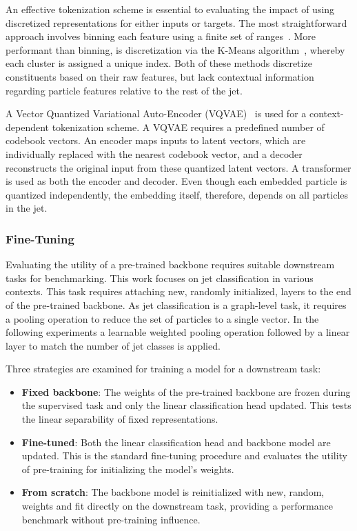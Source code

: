 An effective tokenization scheme is essential to evaluating the impact of using discretized representations for either inputs or targets.
The most straightforward approach involves binning each feature using a finite set of ranges~\cite{JetGPT}.
More performant than binning, is discretization via the K-Means algorithm~\cite{KMeans}, whereby each cluster is assigned a unique index.
Both of these methods discretize constituents based on their raw features, but lack contextual information regarding particle features relative to the rest of the jet.

A Vector Quantized Variational Auto-Encoder (VQVAE)~\cite{VQVAE} is used for a context-dependent tokenization scheme.
A VQVAE requires a predefined number of codebook vectors.
An encoder maps inputs to latent vectors, which are individually replaced with the nearest codebook vector, and a decoder reconstructs the original input from these quantized latent vectors.
A transformer is used as both the encoder and decoder.
Even though each embedded particle is quantized independently, the embedding itself, therefore, depends on all particles in the jet.

\subsubsection{Fine-Tuning}
\label{subsec:fine-tune}

Evaluating the utility of a pre-trained backbone requires suitable downstream tasks for benchmarking.
This work focuses on jet classification in various contexts.
This task requires attaching new, randomly initialized, layers to the end of the pre-trained backbone.
As jet classification is a graph-level task, it requires a pooling operation to reduce the set of particles to a single vector.
In the following experiments a learnable weighted pooling operation followed by a linear layer to match the number of jet classes is applied.

Three strategies are examined for training a model for a downstream task:

\begin{itemize}
    \item \textbf{Fixed backbone}: The weights of the pre-trained backbone are frozen during the supervised task and only the linear classification head updated. This tests the linear separability of fixed representations.
    \item \textbf{Fine-tuned}: Both the linear classification head and backbone model are updated. This is the standard fine-tuning procedure and evaluates the utility of pre-training for initializing the model's weights.
    \item \textbf{From scratch}: The backbone model is reinitialized with new, random, weights and fit directly on the downstream task, providing a performance benchmark without pre-training influence.
\end{itemize}

